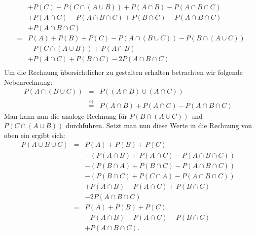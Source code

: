 \begin{Answer}
\begin{eqnarray*}
	&&+P(C)-P(C\cap (A\cup B))+P(A\cap B)-P(A\cap B \cap C)\\
	&& +P(A\cap C)-P(A\cap B \cap C)+P(B\cap C)-P(A\cap B \cap C)\\
	&&+ P(A\cap B\cap C)\\
	&=&P(A)+P(B)+P(C)-P(A\cap(B\cup C))-P(B\cap (A\cup C))\\
	&&-P(C\cap (A\cup B))+P(A\cap B)\\
	&& +P(A\cap C)+P(B\cap C)-2P(A\cap B\cap C)\\
\end{eqnarray*}
Um die Rechnung übersichtlicher zu gestalten erhalten betrachten wir folgende Nebenrechnung:
\begin{eqnarray*}
	P(A\cap (B\cup C))&=& P((A\cap B)\cup(A\cap C))\\
	&\stackrel{\text{e)}}{=}&P(A\cap B)+P(A\cap C)-P(A\cap B\cap C)
\end{eqnarray*}
Man kann nun die analoge Rechnung für $P(B\cap (A\cup C))$ und $P(C\cap (A\cup B))$ durchführen. Setzt man nun diese Werte in die Rechnung von oben ein ergibt sich:
\begin{eqnarray*}
	P(A\cup B\cup C)&=&P(A)+P(B)+P(C)\\
	&&-(P(A\cap B)+P(A\cap C)-P(A\cap B\cap C))\\
	&&-(P(B\cap A)+P(B\cap C)-P(A\cap B\cap C))\\
	&&-(P(B\cap C)+P(C\cap A)-P(A\cap B\cap C))\\
	&&+P(A\cap B)+P(A\cap C)+P(B\cap C)\\
	&&-2P(A\cap B\cap C)\\
	&=&P(A)+P(B)+P(C)\\
	&&-P(A\cap B)-P(A\cap C)-P(B\cap C)\\
	&&+P(A\cap B\cap C).
\end{eqnarray*} 
\end{Answer}


